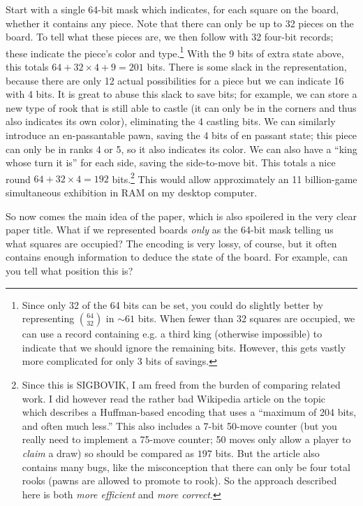 \documentclass[twocolumn]{amsart}
\begin{document}
Start with a single 64-bit mask which indicates, for each square on
the board, whether it contains any piece. Note that there can only be
up to 32 pieces on the board. To tell what these pieces are, we then
follow with 32 four-bit records; these indicate the piece's color and
type.\footnote{Since only 32 of the 64 bits can be set, you could do
  slightly better by representing $\binom{64}{32}$ in $\sim 61$ bits.
  When fewer than 32 squares are occupied, we can use a record
  containing e.g. a third king (otherwise impossible) to indicate that
  we should ignore the remaining bits. However, this gets vastly more
  complicated for only 3 bits of savings.} 
%
With the 9 bits of extra state above, this totals $64+32 \times 4+9=201$
bits. There is some slack in the representation, because there are
only 12 actual possibilities for a piece but we can indicate 16 with 4
bits. It is great to abuse this slack to save bits; for example, we
can store a new type of rook that is still able to castle (it can only
be in the corners and thus also indicates its own color), eliminating
the 4 castling bits. We can similarly introduce an en-passantable
pawn, saving the 4 bits of en passant state; this piece can only be in
ranks 4 or 5, so it also indicates its color. We can also have a
``king whose turn it is'' for each side, saving the side-to-move bit.
This totals a nice round $64+32 \times 4=192$ bits.\footnote{ Since this is
  SIGBOVIK, I am freed from the burden of comparing related work. I
  did however read the rather bad Wikipedia article on the
  topic~\cite{wikipediaboard} which describes a Huffman-based encoding
  that uses a ``maximum of 204 bits, and often much less.'' This also
  includes a 7-bit 50-move counter (but you really need to implement a
  75-move counter; 50 moves only allow a player to {\em claim} a draw)
  so should be compared as $197$ bits. But the article also contains
  many bugs, like the misconception that there can only be four total
  rooks (pawns are allowed to promote to rook). So the approach
  described here is both {\em more efficient} and {\em more correct}.}
%
This would allow approximately an 11 billion-game simultaneous
exhibition in RAM on my desktop computer.

\medskip
So now comes the main idea of the paper, which is also spoilered in the
very clear paper title. What if we represented boards {\em only} as the
64-bit mask telling us what squares are occupied? The encoding is very
lossy, of course, but it often contains enough information to deduce
the state of the board. For example, can you tell what position this is?
\end{document}
